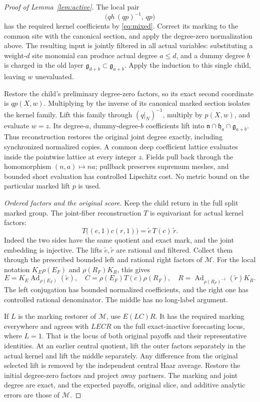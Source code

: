 \documentclass[11pt,a4paper]{article}
\theoremstyle{definition}
\newcommand{\M}{\mathcal M}
\newcommand{\g}{\mathfrak g}
\newcommand{\h}{\mathfrak h}
\newcommand{\n}{\mathfrak n}
\newcommand{\Ad}{\operatorname{Ad}}
\begin{document}
\begin{proof}[Proof of Lemma~\ref{lem:active}]
The local pair
\[
 \bigl(qh\,(qp)^{-1},\,qp\bigr)
\]
has the required kernel coefficients by \eqref{eq:mixed}.
Correct its marking to the common site with the canonical
section, and apply the degree-zero normalization above.
The resulting input is jointly filtered in all actual
variables: substituting a weight-\(d\) site monomial can
produce actual degree \(a\le d\), and a dummy degree \(b\)
is charged in the old layer \(\g_{d+b}\subset\g_{a+b}\).
Apply the induction to this single child, leaving \(w\)
unevaluated.

Restore the child's preliminary degree-zero factors, so its
exact second coordinate is \(qp(X,w)\). Multiplying by the
inverse of its canonical marked section isolates the kernel
family. Lift this family through \((q|_N)^{-1}\), multiply
by \(p(X,w)\), and evaluate \(w=z\). Its degree-\(a\),
dummy-degree-\(b\) coefficients lift into
\(\n\cap\h_a\cap\g_{a+b}\). Thus reconstruction restores
the original joint degree exactly, including synchronized
normalized copies. A common deep coefficient lattice
evaluates inside the pointwise lattice at every integer
\(z\). Fields pull back through the homomorphism
\((n,a)\mapsto na\); pullback preserves supremum meshes,
and bounded short evaluation has controlled Lipschitz cost.
No metric bound on the particular marked lift \(p\) is used.

\textit{Ordered factors and the original score.}
Keep the child return in the full split marked group.
The joint-fiber reconstruction \(T\) is equivariant for
actual kernel factors:
\[
 T\bigl((e,1)c(r,1)\bigr)=\widetilde e\,T(c)\,\widetilde r.
\]
Indeed the two sides have the same quotient and exact
mark, and the joint embedding is injective. The lifts
\(\widetilde e,\widetilde r\) are rational and filtered.
Collect them through the prescribed bounded left and
rational right factors of \(\M\). For the local notation
\(K_E\rho(E_F)\) and \(\rho(R_F)K_R\), this gives
\[
 E=K_E\Ad_{\rho(E_F)}(\widetilde e),\quad
 C=\rho(E_F)T(c)\rho(R_F),\quad
 R=\Ad_{\rho(R_F)^{-1}}(\widetilde r)K_R.
\]
The left conjugation has bounded normalized coefficients,
and the right one has controlled rational denominator.
The middle has no long-label argument.

If \(L\) is the marking restorer of \(\M\), use
\(E(LC)R\). It has the required marking everywhere and
agrees with \(LECR\) on the full exact-inactive forecasting
locus, where \(L=1\). That is the locus of both original
payoffs and their representative identities. At an earlier
central quotient, lift the outer factors separately in
the actual kernel and lift the middle separately.
Any difference from the original selected lift is removed
by the independent central Haar average. Restore the
initial degree-zero factors and project away partners.
The marking and joint degree are exact, and the expected
payoffs, original slice, and additive analytic errors
are those of \(\M\).


\end{proof}
\end{document}
